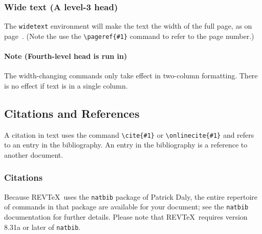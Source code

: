 \documentclass[%
 reprint,
 amsmath,amssymb,
 aps,
]{revtex4-1}
\begin{document}
\subsubsection{Wide text (A level-3 head)}
The \texttt{widetext} environment will make the text the width of the
full page, as on page~\pageref{eq:wideeq}. (Note the use the
\verb+\pageref{#1}+ command to refer to the page number.) 
\paragraph{Note (Fourth-level head is run in)}
The width-changing commands only take effect in two-column formatting. 
There is no effect if text is in a single column.

\subsection{\label{sec:citeref}Citations and References}
A citation in text uses the command \verb+\cite{#1}+ or
\verb+\onlinecite{#1}+ and refers to an entry in the bibliography. 
An entry in the bibliography is a reference to another document.

\subsubsection{Citations}
Because REV\TeX\ uses the \verb+natbib+ package of Patrick Daly, 
the entire repertoire of commands in that package are available for your document;
see the \verb+natbib+ documentation for further details. Please note that
REV\TeX\ requires version 8.31a or later of \verb+natbib+.
\end{document}
